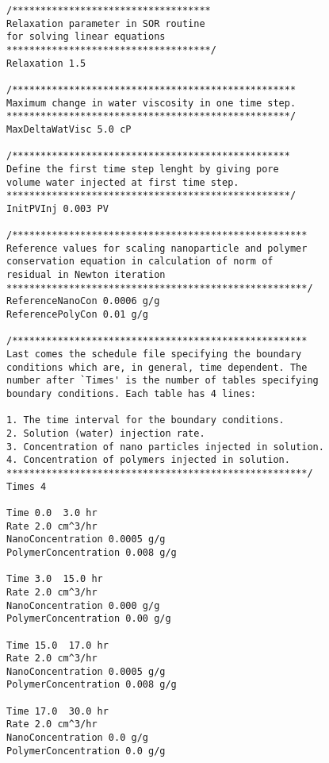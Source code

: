 \begin{appendices}
\begin{lstlisting}
/***********************************
Relaxation parameter in SOR routine 
for solving linear equations
************************************/
Relaxation 1.5

/**************************************************
Maximum change in water viscosity in one time step.
**************************************************/
MaxDeltaWatVisc 5.0 cP

/*************************************************
Define the first time step lenght by giving pore 
volume water injected at first time step.
**************************************************/
InitPVInj 0.003 PV

/****************************************************
Reference values for scaling nanoparticle and polymer
conservation equation in calculation of norm of
residual in Newton iteration 
*****************************************************/
ReferenceNanoCon 0.0006 g/g
ReferencePolyCon 0.01 g/g

/****************************************************
Last comes the schedule file specifying the boundary 
conditions which are, in general, time dependent. The
number after `Times' is the number of tables specifying 
boundary conditions. Each table has 4 lines:

1. The time interval for the boundary conditions.
2. Solution (water) injection rate.
3. Concentration of nano particles injected in solution.
4. Concentration of polymers injected in solution.
*****************************************************/
Times 4

Time 0.0  3.0 hr
Rate 2.0 cm^3/hr
NanoConcentration 0.0005 g/g
PolymerConcentration 0.008 g/g

Time 3.0  15.0 hr
Rate 2.0 cm^3/hr
NanoConcentration 0.000 g/g
PolymerConcentration 0.00 g/g

Time 15.0  17.0 hr
Rate 2.0 cm^3/hr
NanoConcentration 0.0005 g/g
PolymerConcentration 0.008 g/g

Time 17.0  30.0 hr
Rate 2.0 cm^3/hr
NanoConcentration 0.0 g/g
PolymerConcentration 0.0 g/g

\end{lstlisting}



\end{appendices}